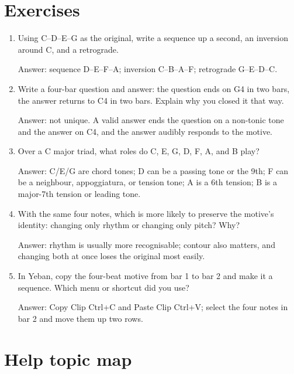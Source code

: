 \section{Exercises}


\begin{exercise}
\begin{enumerate}
  \item Using C--D--E--G as the original, write a sequence up a second, an inversion around C, and a retrograde.
  \par\noindent Answer: sequence D--E--F--A; inversion C--B--A--F; retrograde G--E--D--C.
  \item Write a four-bar question and answer: the question ends on G4 in two bars, the answer returns to C4 in two bars. Explain why you closed it that way.
  \par\noindent Answer: not unique. A valid answer ends the question on a non-tonic tone and the answer on C4, and the answer audibly responds to the motive.
  \item Over a C major triad, what roles do C, E, G, D, F, A, and B play?
  \par\noindent Answer: C/E/G are chord tones; D can be a passing tone or the 9th; F can be a neighbour, appoggiatura, or tension tone; A is a 6th tension; B is a major-7th tension or leading tone.
  \item With the same four notes, which is more likely to preserve the motive's identity: changing only rhythm or changing only pitch? Why?
  \par\noindent Answer: rhythm is usually more recognisable; contour also matters, and changing both at once loses the original most easily.
  \item In Yeban, copy the four-beat motive from bar 1 to bar 2 and make it a sequence. Which menu or shortcut did you use?
  \par\noindent Answer: Copy Clip Ctrl+C and Paste Clip Ctrl+V; select the four notes in bar 2 and move them up two rows.
\end{enumerate}
\end{exercise}

\section{Help topic map}

